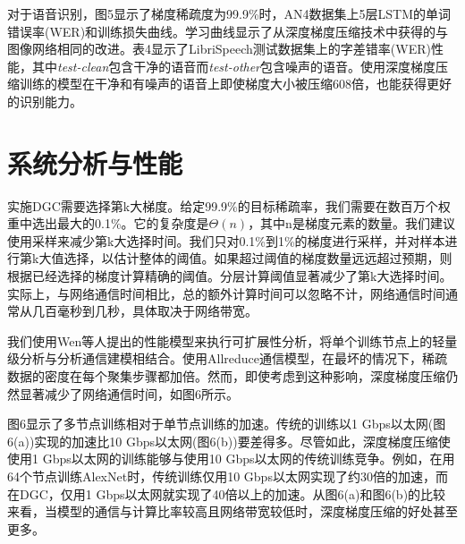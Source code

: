 对于语音识别，图5显示了梯度稀疏度为99.9\%时，AN4数据集上5层LSTM的单词错误率(WER)和训练损失曲线。学习曲线显示了从深度梯度压缩技术中获得的与图像网络相同的改进。表4显示了LibriSpeech测试数据集上的字差错率(WER)性能，其中\textit{test-clean}包含干净的语音而\textit{test-other}包含噪声的语音。使用深度梯度压缩训练的模型在干净和有噪声的语音上即使梯度大小被压缩608倍，也能获得更好的识别能力。

\section{系统分析与性能}
实施DGC需要选择第k大梯度。给定99.9\%的目标稀疏率，我们需要在数百万个权重中选出最大的0.1\%。它的复杂度是$\Theta(n)$，其中n是梯度元素的数量。我们建议使用采样来减少第k大选择时间。我们只对0.1\%到1\%的梯度进行采样，并对样本进行第k大值选择，以估计整体的阈值。如果超过阈值的梯度数量远远超过预期，则根据已经选择的梯度计算精确的阈值。分层计算阈值显著减少了第k大选择时间。实际上，与网络通信时间相比，总的额外计算时间可以忽略不计，网络通信时间通常从几百毫秒到几秒，具体取决于网络带宽。

我们使用Wen等人提出的性能模型来执行可扩展性分析，将单个训练节点上的轻量级分析与分析通信建模相结合。使用Allreduce通信模型，在最坏的情况下，稀疏数据的密度在每个聚集步骤都加倍。然而，即使考虑到这种影响，深度梯度压缩仍然显著减少了网络通信时间，如图6所示。

图6显示了多节点训练相对于单节点训练的加速。传统的训练以1 Gbps以太网(图6(a))实现的加速比10 Gbps以太网(图6(b))要差得多。尽管如此，深度梯度压缩使使用1 Gbps以太网的训练能够与使用10 Gbps以太网的传统训练竞争。例如，在用64个节点训练AlexNet时，传统训练仅用10 Gbps以太网实现了约30倍的加速，而在DGC，仅用1 Gbps以太网就实现了40倍以上的加速。从图6(a)和图6(b)的比较来看，当模型的通信与计算比率较高且网络带宽较低时，深度梯度压缩的好处甚至更多。
